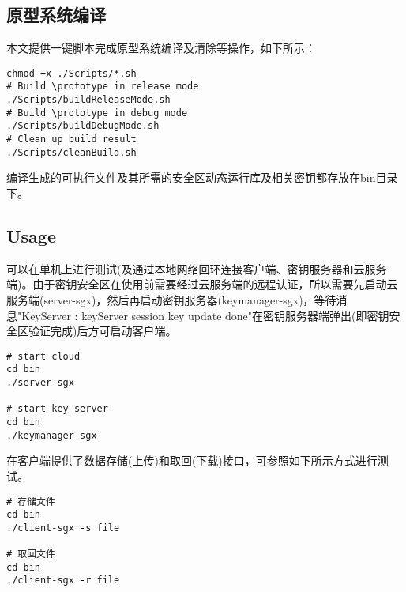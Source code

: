 \subsection*{原型系统编译}
本文提供一键脚本完成原型系统编译及清除等操作，如下所示：

\begin{lstlisting}[style=shell]
chmod +x ./Scripts/*.sh
# Build \prototype in release mode
./Scripts/buildReleaseMode.sh
# Build \prototype in debug mode
./Scripts/buildDebugMode.sh
# Clean up build result
./Scripts/cleanBuild.sh
\end{lstlisting}

编译生成的可执行文件及其所需的安全区动态运行库及相关密钥都存放在bin目录下。

\subsection*{Usage}
\prototype 可以在单机上进行测试(及通过本地网络回环连接客户端、密钥服务器和云服务端)。由于密钥安全区在使用前需要经过云服务端的远程认证，所以需要先启动云服务端(server-sgx)，然后再启动密钥服务器(keymanager-sgx)，等待消息"KeyServer : keyServer session key update done"在密钥服务器端弹出(即密钥安全区验证完成)后方可启动客户端。
\begin{lstlisting}[style=shell]
# start cloud
cd bin
./server-sgx

# start key server
cd bin
./keymanager-sgx
\end{lstlisting}

\prototype 在客户端提供了数据存储(上传)和取回(下载)接口，可参照如下所示方式进行测试。

\begin{lstlisting}[style=shell]
# 存储文件
cd bin
./client-sgx -s file

# 取回文件
cd bin
./client-sgx -r file
\end{lstlisting}

